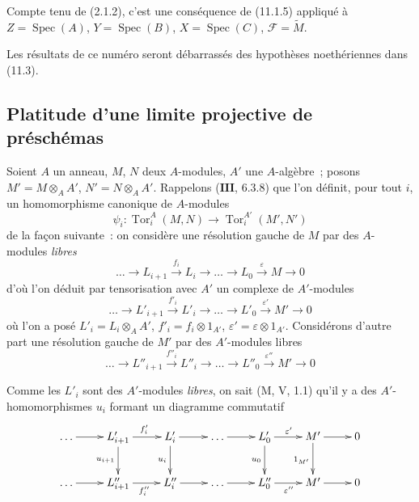 Compte tenu de (2.1.2), c'est une conséquence de (11.1.5) appliqué à
$Z=\operatorname{Spec}(A)$, $Y=\operatorname{Spec}(B)$,
$X=\operatorname{Spec}(C)$, $\mathcal F=\widetilde M$.

Les résultats de ce numéro seront débarrassés des hypothèses noethériennes
dans (11.3).

\subsection{Platitude d'une limite projective de préschémas}
\label{subsection:IV.11.2-fr}

\begin{env}[11.2.1]
\label{IV.11.2.1-fr}
Soient $A$ un anneau, $M$, $N$ deux $A$-modules, $A'$ une $A$-algèbre~;
posons $M'=M\otimes_AA'$, $N'=N\otimes_AA'$. Rappelons
($\mathbf{III}$, 6.3.8) que l'on définit, pour tout $i$, un homomorphisme
canonique de $A$-modules
\begin{equation}
\psi_i:\operatorname{Tor}_i^A(M,N)\to\operatorname{Tor}_i^{A'}(M',N')
\label{IV.11.2.1.1-fr}
\tag{11.2.1.1}
\end{equation}
de la façon suivante~: on considère une résolution gauche de $M$ par des
$A$-modules \emph{libres}
\begin{equation}
\ldots\longrightarrow L_{i+1}\xrightarrow{f_i}L_i\longrightarrow\ldots
\longrightarrow L_0\xrightarrow{\varepsilon}M\longrightarrow0
\label{IV.11.2.1.2-fr}
\tag{11.2.1.2}
\end{equation}
d'où l'on déduit par tensorisation avec $A'$ un complexe de $A'$-modules
\begin{equation}
\ldots\longrightarrow L'_{i+1}\xrightarrow{f'_i}L'_i\longrightarrow\ldots
\longrightarrow L'_0\xrightarrow{\varepsilon'}M'\longrightarrow0
\label{IV.11.2.1.3-fr}
\tag{11.2.1.3}
\end{equation}
où l'on a posé $L'_i=L_i\otimes_AA'$, $f'_i=f_i\otimes1_{A'}$,
$\varepsilon'=\varepsilon\otimes1_{A'}$. Considérons d'autre part une
résolution gauche de $M'$ par des $A'$-modules libres
\begin{equation}
\ldots\longrightarrow L''_{i+1}\xrightarrow{f''_i}L''_i\longrightarrow\ldots
\longrightarrow L''_0\xrightarrow{\varepsilon''}M'\longrightarrow0
\label{IV.11.2.1.4-fr}
\tag{11.2.1.4}
\end{equation}
\end{env}

\noindent Comme les $L'_i$ sont des $A'$-modules \emph{libres}, on sait (M, V, 1.1) qu'il y a
des $A'$-homomorphismes $u_i$ formant un diagramme commutatif
\[
\xymatrix{
\ldots\ar[r]&L'_{i+1}\ar[r]^{f'_i}\ar[d]_{u_{i+1}}&
L'_i\ar[r]\ar[d]_{u_i}&\ldots\ar[r]&
L'_0\ar[r]^{\varepsilon'}\ar[d]_{u_0}&M'\ar[r]\ar[d]_{1_{M'}}&0\\
\ldots\ar[r]&L''_{i+1}\ar[r]_{f''_i}&L''_i\ar[r]&\ldots\ar[r]&
L''_0\ar[r]_{\varepsilon''}&M'\ar[r]&0
}
\]

